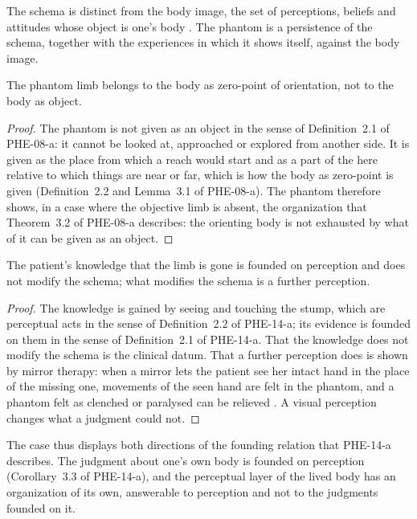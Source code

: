 \documentclass{situationist-preprint}
\begin{document}
The schema is distinct from the body image, the set of perceptions, beliefs and attitudes whose object is one's body \citep{Gallagher2005}. The phantom is a persistence of the schema, together with the experiences in which it shows itself, against the body image.

\begin{proposition}\label{p:zero}
The phantom limb belongs to the body as zero-point of orientation, not to the body as object.
\end{proposition}

\begin{proof}
The phantom is not given as an object in the sense of Definition~2.1 of PHE-08-a: it cannot be looked at, approached or explored from another side. It is given as the place from which a reach would start and as a part of the here relative to which things are near or far, which is how the body as zero-point is given (Definition~2.2 and Lemma~3.1 of PHE-08-a). The phantom therefore shows, in a case where the objective limb is absent, the organization that Theorem~3.2 of PHE-08-a describes: the orienting body is not exhausted by what of it can be given as an object.
\end{proof}

\begin{proposition}\label{p:founding}
The patient's knowledge that the limb is gone is founded on perception and does not modify the schema; what modifies the schema is a further perception.
\end{proposition}

\begin{proof}
The knowledge is gained by seeing and touching the stump, which are perceptual acts in the sense of Definition~2.2 of PHE-14-a; its evidence is founded on them in the sense of Definition~2.1 of PHE-14-a. That the knowledge does not modify the schema is the clinical datum. That a further perception does is shown by mirror therapy: when a mirror lets the patient see her intact hand in the place of the missing one, movements of the seen hand are felt in the phantom, and a phantom felt as clenched or paralysed can be relieved \citep{Ramachandran1996}. A visual perception changes what a judgment could not.
\end{proof}

The case thus displays both directions of the founding relation that PHE-14-a describes. The judgment about one's own body is founded on perception (Corollary~3.3 of PHE-14-a), and the perceptual layer of the lived body has an organization of its own, answerable to perception and not to the judgments founded on it.
\end{document}
